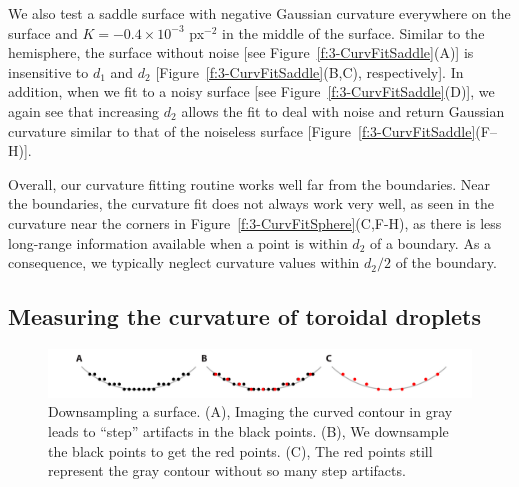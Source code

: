 We also test a saddle surface with negative Gaussian curvature everywhere on the surface and $K = - 0.4 \times 10^{-3}$ px$^{-2}$ in the middle of the surface.
Similar to the hemisphere, the surface without noise [see Figure~\ref{f:3-CurvFitSaddle}(A)] is insensitive to $d_1$ and $d_2$ [Figure~\ref{f:3-CurvFitSaddle}(B,C), respectively].
In addition, when we fit to a noisy surface [see Figure~\ref{f:3-CurvFitSaddle}(D)], we again see that increasing $d_2$ allows the fit to deal with noise and return Gaussian curvature similar to that of the noiseless surface [Figure~\ref{f:3-CurvFitSaddle}(F--H)].

Overall, our curvature fitting routine works well far from the boundaries.
Near the boundaries, the curvature fit does not always work very well, as seen in the curvature near the corners in Figure~\ref{f:3-CurvFitSphere}(C,F-H), as there is less long-range information available when a point is within $d_2$ of a boundary.
As a consequence, we typically neglect curvature values within $d_2/2$ of the boundary.


\subsection{Measuring the curvature of toroidal droplets}
\begin{figure}
  \centering
  \includegraphics{figures/C3/Ch3-Figs_Sampling.png}
  \caption{Downsampling a surface.
  (A), Imaging the curved contour in gray leads to ``step'' artifacts in the black points.
  (B), We downsample the black points to get the red points.
  (C), The red points still represent the gray contour without so many step artifacts.}\label{f:3-Sampling}
\end{figure}

